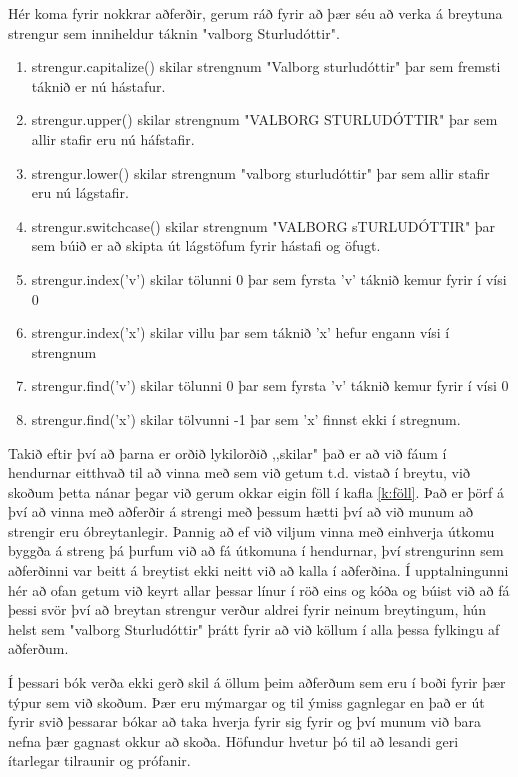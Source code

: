 Hér koma fyrir nokkrar aðferðir, gerum ráð fyrir að þær séu að verka á breytuna strengur sem inniheldur táknin "valborg Sturludóttir".
\vspace{5px}
\begin{enumerate}
	\item strengur.capitalize() skilar strengnum "Valborg sturludóttir" þar sem fremsti táknið er nú hástafur.
	\item strengur.upper() skilar strengnum "VALBORG STURLUDÓTTIR" þar sem allir stafir eru nú háfstafir.
	\item strengur.lower() skilar strengnum "valborg sturludóttir" þar sem allir stafir eru nú lágstafir.
	\item strengur.switchcase() skilar strengnum "VALBORG sTURLUDÓTTIR" þar sem búið er að skipta út lágstöfum fyrir hástafi og öfugt.
	\item strengur.index('v') skilar tölunni 0 þar sem fyrsta 'v' táknið kemur fyrir í vísi 0
	\item strengur.index('x') skilar villu þar sem táknið 'x' hefur engann vísi í strengnum
	\item strengur.find('v') skilar tölunni 0 þar sem fyrsta 'v' táknið kemur fyrir í vísi 0
	\item strengur.find('x') skilar tölvunni -1 þar sem 'x' finnst ekki í stregnum. 
\end{enumerate}
\vspace{10px}

Takið eftir því að þarna er orðið lykilorðið ,,skilar" það er að við fáum í hendurnar eitthvað til að vinna með sem við getum t.d. vistað í breytu, við skoðum þetta nánar þegar við gerum okkar eigin föll í kafla \ref{k:föll}.
Það er þörf á því að vinna með aðferðir á strengi með þessum hætti því að við munum að strengir eru óbreytanlegir.
Þannig að ef við viljum vinna með einhverja útkomu byggða á streng þá þurfum við að fá útkomuna í hendurnar, því strengurinn sem aðferðinni var beitt á breytist ekki neitt við að kalla í aðferðina.
Í upptalningunni hér að ofan getum við keyrt allar þessar línur í röð eins og kóða og búist við að fá þessi svör því að breytan strengur verður aldrei fyrir neinum breytingum, hún helst sem "valborg Sturludóttir" þrátt fyrir að við köllum í alla þessa fylkingu af aðferðum.

Í þessari bók verða ekki gerð skil á öllum þeim aðferðum sem eru í boði fyrir þær týpur sem við skoðum.
Þær eru mýmargar og til ýmiss gagnlegar en það er út fyrir svið þessarar bókar að taka hverja fyrir sig fyrir og því munum við bara nefna þær gagnast okkur að skoða.
Höfundur hvetur þó til að lesandi geri ítarlegar tilraunir og prófanir.